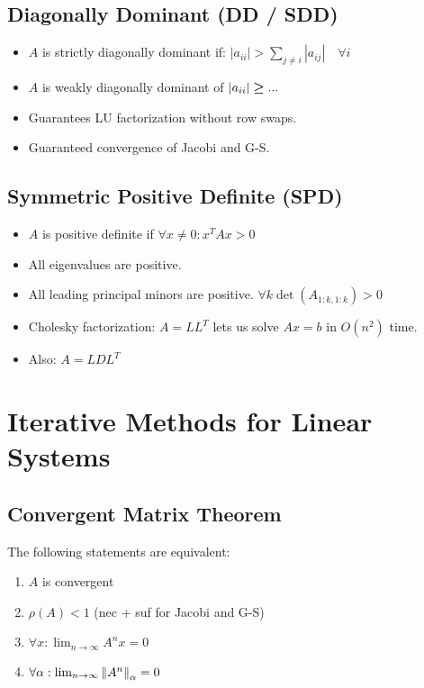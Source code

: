 \documentclass[8pt, letterpaper]{extarticle}
\begin{document}
\begin{multicols*}{3}
  \subsection{Diagonally Dominant (DD / SDD)}
  \begin{itemize}
    \item $ A $ is strictly diagonally dominant if: \newline
      $\displaystyle|a_{ii}| > \sum_{j \ne i} |a_{ij}| \quad \forall i$
    \item $A$ is weakly diagonally dominant of $\abs{a_{ii}} \boldsymbol{\geq} ...$
    \item Guarantees LU factorization without row swaps.
    \item Guaranteed convergence of Jacobi and G-S.
  \end{itemize}

  \subsection{Symmetric Positive Definite (SPD)}
  \begin{itemize}
    \item $ A $ is positive definite if
      $\forall x \ne 0 : x^T A x > 0$
    \item All eigenvalues are positive.
    \item All leading principal minors are positive. $\forall k\det(A_{1:k, 1:k}) > 0$
    \item Cholesky factorization: $A = LL^T$ lets us solve $Ax=b$ in $O(n^2)$
      time.
    \item Also: $A = LDL^T$
  \end{itemize}

  \section{Iterative Methods for Linear Systems}

  \subsection{Convergent Matrix Theorem}
  The following statements are equivalent:
  \begin{enumerate}[label=(\roman*)]
    \item $A$ is convergent
    \item $\rho(A) < 1$ (nec + suf for Jacobi and G-S)
    \item $\forall x: \lim_{n \to \infty} A^nx = 0$
    \item $\forall \alpha: \lim_{n\to\infty} \norm{A^n}_\alpha = 0$
  \end{enumerate}


\end{multicols*}
\end{document}

